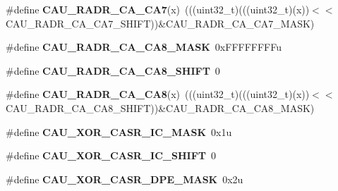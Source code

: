 \begin{DoxyCompactItemize}
\item 
\#define {\bfseries C\+A\+U\+\_\+\+R\+A\+D\+R\+\_\+\+C\+A\+\_\+\+C\+A7}(x)~(((uint32\+\_\+t)(((uint32\+\_\+t)(x))$<$$<$C\+A\+U\+\_\+\+R\+A\+D\+R\+\_\+\+C\+A\+\_\+\+C\+A7\+\_\+\+S\+H\+I\+FT))\&C\+A\+U\+\_\+\+R\+A\+D\+R\+\_\+\+C\+A\+\_\+\+C\+A7\+\_\+\+M\+A\+SK)\hypertarget{group__CAU__Register__Masks_gafcc3228ff234a13b8752ff5c6fc6a37f}{}\label{group__CAU__Register__Masks_gafcc3228ff234a13b8752ff5c6fc6a37f}

\item 
\#define {\bfseries C\+A\+U\+\_\+\+R\+A\+D\+R\+\_\+\+C\+A\+\_\+\+C\+A8\+\_\+\+M\+A\+SK}~0x\+F\+F\+F\+F\+F\+F\+F\+Fu\hypertarget{group__CAU__Register__Masks_ga0becdc994c7da7ab67251bd2da040493}{}\label{group__CAU__Register__Masks_ga0becdc994c7da7ab67251bd2da040493}

\item 
\#define {\bfseries C\+A\+U\+\_\+\+R\+A\+D\+R\+\_\+\+C\+A\+\_\+\+C\+A8\+\_\+\+S\+H\+I\+FT}~0\hypertarget{group__CAU__Register__Masks_ga5dde041188525dacccc86994f3b4a62c}{}\label{group__CAU__Register__Masks_ga5dde041188525dacccc86994f3b4a62c}

\item 
\#define {\bfseries C\+A\+U\+\_\+\+R\+A\+D\+R\+\_\+\+C\+A\+\_\+\+C\+A8}(x)~(((uint32\+\_\+t)(((uint32\+\_\+t)(x))$<$$<$C\+A\+U\+\_\+\+R\+A\+D\+R\+\_\+\+C\+A\+\_\+\+C\+A8\+\_\+\+S\+H\+I\+FT))\&C\+A\+U\+\_\+\+R\+A\+D\+R\+\_\+\+C\+A\+\_\+\+C\+A8\+\_\+\+M\+A\+SK)\hypertarget{group__CAU__Register__Masks_ga60e97a6dd9f8f0ba91c511ee4b8cb438}{}\label{group__CAU__Register__Masks_ga60e97a6dd9f8f0ba91c511ee4b8cb438}

\item 
\#define {\bfseries C\+A\+U\+\_\+\+X\+O\+R\+\_\+\+C\+A\+S\+R\+\_\+\+I\+C\+\_\+\+M\+A\+SK}~0x1u\hypertarget{group__CAU__Register__Masks_gaca3c61b76adc9812ea3851c4b704c43f}{}\label{group__CAU__Register__Masks_gaca3c61b76adc9812ea3851c4b704c43f}

\item 
\#define {\bfseries C\+A\+U\+\_\+\+X\+O\+R\+\_\+\+C\+A\+S\+R\+\_\+\+I\+C\+\_\+\+S\+H\+I\+FT}~0\hypertarget{group__CAU__Register__Masks_ga371852a2013f6f7d79b8fcd434367358}{}\label{group__CAU__Register__Masks_ga371852a2013f6f7d79b8fcd434367358}

\item 
\#define {\bfseries C\+A\+U\+\_\+\+X\+O\+R\+\_\+\+C\+A\+S\+R\+\_\+\+D\+P\+E\+\_\+\+M\+A\+SK}~0x2u\hypertarget{group__CAU__Register__Masks_ga71d1db03ca6c06a051297201f2e8d855}{}\label{group__CAU__Register__Masks_ga71d1db03ca6c06a051297201f2e8d855}


\end{DoxyCompactItemize}
